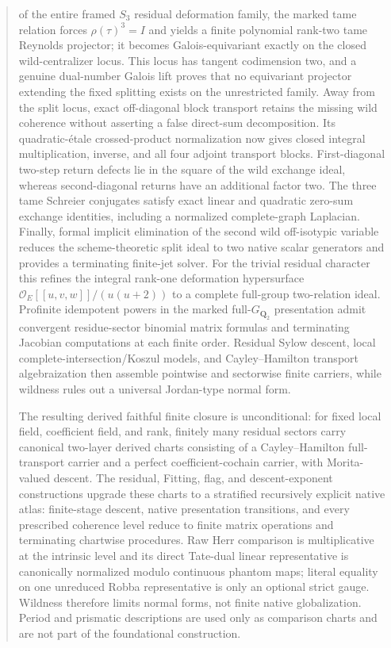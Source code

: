 \documentclass[11pt]{article}
\theoremstyle{definition}
\begin{document}
\begin{abstract}
of the entire framed $S_3$ residual deformation family, the marked tame relation forces $\rho(\tau)^3=I$ and yields a finite polynomial rank-two tame Reynolds projector; it becomes Galois-equivariant exactly on the closed wild-centralizer locus.  This locus has tangent codimension two, and a genuine dual-number Galois lift proves that no equivariant projector extending the fixed splitting exists on the unrestricted family.  Away from the split locus, exact off-diagonal block transport retains the missing wild coherence without asserting a false direct-sum decomposition.  Its quadratic-\'etale crossed-product normalization now gives closed integral multiplication, inverse, and all four adjoint transport blocks.  First-diagonal two-step return defects lie in the square of the wild exchange ideal, whereas second-diagonal returns have an additional factor two.  The three tame Schreier conjugates satisfy exact linear and quadratic zero-sum exchange identities, including a normalized complete-graph Laplacian.  Finally, formal implicit elimination of the second wild off-isotypic variable reduces the scheme-theoretic split ideal to two native scalar generators and provides a terminating finite-jet solver.  For the trivial residual character this refines the integral rank-one deformation hypersurface $\mathcal O_E[[u,v,w]]/(u(u+2))$ to a complete full-group two-relation ideal.  Profinite idempotent powers in the marked full-$G_{\mathbf Q_2}$ presentation admit convergent residue-sector binomial matrix formulas and terminating Jacobian computations at each finite order.  Residual Sylow descent, local complete-intersection/Koszul models, and Cayley--Hamilton transport algebraization then assemble pointwise and sectorwise finite carriers, while wildness rules out a universal Jordan-type normal form.

The resulting derived faithful finite closure is unconditional: for fixed local field, coefficient field, and rank, finitely many residual sectors carry canonical two-layer derived charts consisting of a Cayley--Hamilton full-transport carrier and a perfect coefficient-cochain carrier, with Morita-valued descent.  The residual, Fitting, flag, and descent-exponent constructions upgrade these charts to a stratified recursively explicit native atlas: finite-stage descent, native presentation transitions, and every prescribed coherence level reduce to finite matrix operations and terminating chartwise procedures.  Raw Herr comparison is multiplicative at the intrinsic level and its direct Tate-dual linear representative is canonically normalized modulo continuous phantom maps; literal equality on one unreduced Robba representative is only an optional strict gauge.  Wildness therefore limits normal forms, not finite native globalization.  Period and prismatic descriptions are used only as comparison charts and are not part of the foundational construction.
\end{abstract}
\end{document}
